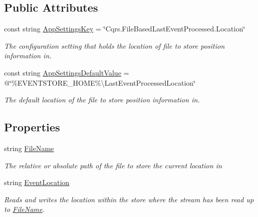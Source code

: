 \subsection*{Public Attributes}
\begin{DoxyCompactItemize}
\item 
const string \hyperlink{classCqrs_1_1Bus_1_1FileBasedLastEventProcessedStore_ab7387488772c28f22cfb276f4f0b3adb_ab7387488772c28f22cfb276f4f0b3adb}{App\+Settings\+Key} = \char`\"{}Cqrs.\+File\+Based\+Last\+Event\+Processed.\+Location\char`\"{}
\begin{DoxyCompactList}\small\item\em The configuration setting that holds the location of file to store position information in. \end{DoxyCompactList}\item 
const string \hyperlink{classCqrs_1_1Bus_1_1FileBasedLastEventProcessedStore_ab72de68ea94158dfa1c00ea697d84968_ab72de68ea94158dfa1c00ea697d84968}{App\+Settings\+Default\+Value} = @\char`\"{}\%E\+V\+E\+N\+T\+S\+T\+O\+R\+E\+\_\+\+H\+O\+ME\%\textbackslash{}Last\+Event\+Processed\+Location\char`\"{}
\begin{DoxyCompactList}\small\item\em The default location of the file to store position information in. \end{DoxyCompactList}\end{DoxyCompactItemize}
\subsection*{Properties}
\begin{DoxyCompactItemize}
\item 
string \hyperlink{classCqrs_1_1Bus_1_1FileBasedLastEventProcessedStore_af58c18745fa63aaa92f3f1921d582068_af58c18745fa63aaa92f3f1921d582068}{File\+Name}
\begin{DoxyCompactList}\small\item\em The relative or absolute path of the file to store the current location in \end{DoxyCompactList}\item 
string \hyperlink{classCqrs_1_1Bus_1_1FileBasedLastEventProcessedStore_a98ea27c14b626c4c7bd5f2e5bb8ca7a4_a98ea27c14b626c4c7bd5f2e5bb8ca7a4}{Event\+Location}
\begin{DoxyCompactList}\small\item\em Reads and writes the location within the store where the stream has been read up to \hyperlink{classCqrs_1_1Bus_1_1FileBasedLastEventProcessedStore_af58c18745fa63aaa92f3f1921d582068_af58c18745fa63aaa92f3f1921d582068}{File\+Name}. \end{DoxyCompactList}\end{DoxyCompactItemize}


